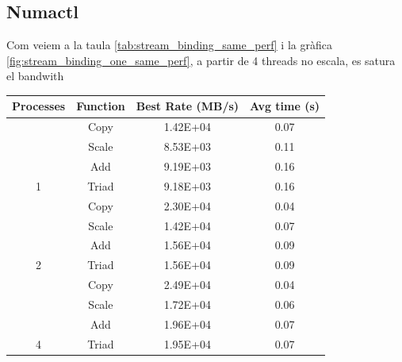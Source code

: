 \subsection{Numactl}
Com veiem a la taula \ref{tab:stream_binding_same_perf} i la gràfica \ref{fig:stream_binding_one_same_perf}, a partir de 4 threads no escala, es satura el bandwith
\begin{table}[h]
    \centering
\begin{tabular}{cccc}
Processes            & Function                     & Best Rate (MB/s)                 & Avg time (s)                 \\ \hline \hline
                     & \cellcolor[HTML]{EFEFEF}Copy & \cellcolor[HTML]{EFEFEF}1.42E+04 & \cellcolor[HTML]{EFEFEF}0.07 \\
                     & Scale                        & 8.53E+03                         & 0.11                         \\
                     & \cellcolor[HTML]{EFEFEF}Add  & \cellcolor[HTML]{EFEFEF}9.19E+03 & \cellcolor[HTML]{EFEFEF}0.16 \\
\multirow{-4}{*}{1}  & Triad                        & 9.18E+03                         & 0.16                         \\ \hline
                     & \cellcolor[HTML]{EFEFEF}Copy & \cellcolor[HTML]{EFEFEF}2.30E+04 & \cellcolor[HTML]{EFEFEF}0.04 \\
                     & Scale                        & 1.42E+04                         & 0.07                         \\
                     & \cellcolor[HTML]{EFEFEF}Add  & \cellcolor[HTML]{EFEFEF}1.56E+04 & \cellcolor[HTML]{EFEFEF}0.09 \\
\multirow{-4}{*}{2}  & Triad                        & 1.56E+04                         & 0.09                         \\ \hline
                     & \cellcolor[HTML]{EFEFEF}Copy & \cellcolor[HTML]{EFEFEF}2.49E+04 & \cellcolor[HTML]{EFEFEF}0.04 \\
                     & Scale                        & 1.72E+04                         & 0.06                         \\
                     & \cellcolor[HTML]{EFEFEF}Add  & \cellcolor[HTML]{EFEFEF}1.96E+04 & \cellcolor[HTML]{EFEFEF}0.07 \\
\multirow{-4}{*}{4}  & Triad                        & 1.95E+04                         & 0.07                         \\ \hline

\end{tabular}
\end{table}

